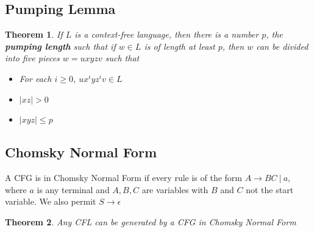 \documentclass{article}
\newtheorem{thm}{Theorem}
\begin{document}
    \subsection{Pumping Lemma}
        \begin{thm}
            If $L$ is a context-free language, then there is a number $p$, the \textbf{pumping length} such that if $w \in L$ is of length at least $p$, then $w$ can be divided into five pieces $w = uxyzv$ such that
            \begin{itemize}
                \item For each $i \geq 0$, $ux^iyz^iv \in L$
                \item $|xz| > 0$
                \item $|xyz| \leq p$
            \end{itemize}
        \end{thm}
    \subsection{Chomsky Normal Form}
        A CFG is in Chomsky Normal Form if every rule is of the form $A \to BC \ | \ a$, where $a$ is any terminal and $A,B,C$ are variables with $B$ and $C$ not the start variable. We also permit $S \to \epsilon$
        \begin{thm}
            Any CFL can be generated by a CFG in Chomsky Normal Form
        \end{thm}
\end{document}
